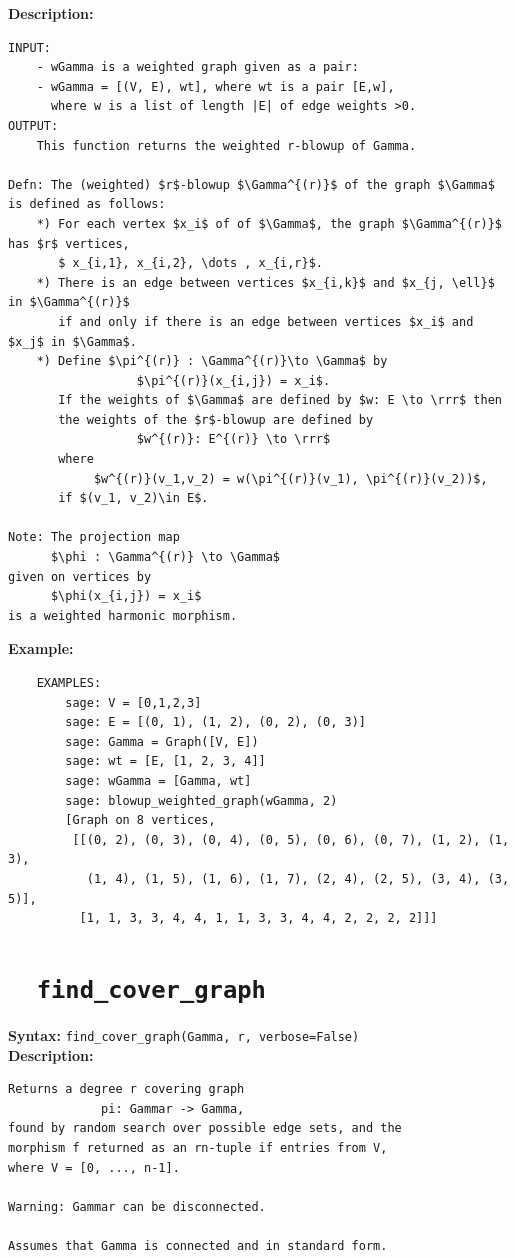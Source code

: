 \documentclass{article}
\begin{document}
\textbf{Description:}
\begin{verbatim}
INPUT:
    - wGamma is a weighted graph given as a pair: 
    - wGamma = [(V, E), wt], where wt is a pair [E,w], 
      where w is a list of length |E| of edge weights >0.
OUTPUT:
    This function returns the weighted r-blowup of Gamma.

Defn: The (weighted) $r$-blowup $\Gamma^{(r)}$ of the graph $\Gamma$ is defined as follows: 
    *) For each vertex $x_i$ of of $\Gamma$, the graph $\Gamma^{(r)}$ has $r$ vertices, 
       $ x_{i,1}, x_{i,2}, \dots , x_{i,r}$.
    *) There is an edge between vertices $x_{i,k}$ and $x_{j, \ell}$ in $\Gamma^{(r)}$
       if and only if there is an edge between vertices $x_i$ and $x_j$ in $\Gamma$.
    *) Define $\pi^{(r)} : \Gamma^{(r)}\to \Gamma$ by
                  $\pi^{(r)}(x_{i,j}) = x_i$.
       If the weights of $\Gamma$ are defined by $w: E \to \rrr$ then 
       the weights of the $r$-blowup are defined by 
                  $w^{(r)}: E^{(r)} \to \rrr$
       where 
            $w^{(r)}(v_1,v_2) = w(\pi^{(r)}(v_1), \pi^{(r)}(v_2))$,
       if $(v_1, v_2)\in E$.

Note: The projection map 
      $\phi : \Gamma^{(r)} \to \Gamma$ 
given on vertices by 
      $\phi(x_{i,j}) = x_i$ 
is a weighted harmonic morphism. 
\end{verbatim}

\textbf{Example:}
\begin{verbatim}
    EXAMPLES:
        sage: V = [0,1,2,3]
        sage: E = [(0, 1), (1, 2), (0, 2), (0, 3)]
        sage: Gamma = Graph([V, E])
        sage: wt = [E, [1, 2, 3, 4]] 
        sage: wGamma = [Gamma, wt]
        sage: blowup_weighted_graph(wGamma, 2)
        [Graph on 8 vertices,
         [[(0, 2), (0, 3), (0, 4), (0, 5), (0, 6), (0, 7), (1, 2), (1, 3),
           (1, 4), (1, 5), (1, 6), (1, 7), (2, 4), (2, 5), (3, 4), (3, 5)],
          [1, 1, 3, 3, 4, 4, 1, 1, 3, 3, 4, 4, 2, 2, 2, 2]]] 
\end{verbatim}

\section{\tt \ \ find\_cover\_graph}

\textbf{Syntax:} \verb}find_cover_graph(Gamma, r, verbose=False)}\\

\textbf{Description:}
\begin{verbatim}
Returns a degree r covering graph
             pi: Gammar -> Gamma,
found by random search over possible edge sets, and the 
morphism f returned as an rn-tuple if entries from V,
where V = [0, ..., n-1].

Warning: Gammar can be disconnected.

Assumes that Gamma is connected and in standard form.
\end{verbatim}
\end{document}
